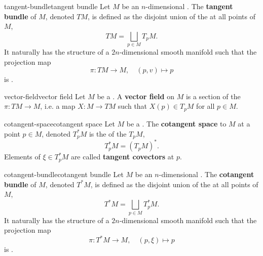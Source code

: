 \begin{topic}{tangent-bundle}{tangent bundle}
    Let $M$ be an $n$-dimensional . The \textbf{tangent bundle} of $M$, denoted $TM$, is defined as the disjoint union of the  at all points of $M$,
    \[ TM = \bigsqcup_{p \in M} T_p M . \]
    It naturally has the structure of a $2n$-dimensional smooth manifold such that the projection map
    \[ \pi : TM \to M, \quad (p, v) \mapsto p \]
    is .
\end{topic}

\begin{topic}{vector-field}{vector field}
    Let $M$ be a . A \textbf{vector field} on $M$ is a section of the  $\pi : TM \to M$, i.e. a map $X : M \to TM$ such that $X(p) \in T_p M$ for all $p \in M$.
\end{topic}

\begin{topic}{cotangent-space}{cotangent space}
    Let $M$ be a . The \textbf{cotangent space} to $M$ at a point $p \in M$, denoted $T^*_p M$ is the  of the  $T_p M$,
    \[ T^*_p M = (T_p M)^* . \]
    Elements of $\xi \in T^*_p M$ are called \textbf{tangent covectors} at $p$.
\end{topic}

\begin{topic}{cotangent-bundle}{cotangent bundle}
    Let $M$ be an $n$-dimensional . The \textbf{cotangent bundle} of $M$, denoted $T^*M$, is defined as the disjoint union of the  at all points of $M$,
    \[ T^*M = \bigsqcup_{p \in M} T^*_p M . \]
    It naturally has the structure of a $2n$-dimensional smooth manifold such that the projection map
    \[ \pi : T^*M \to M, \quad (p, \xi) \mapsto p \]
    is .
\end{topic}

